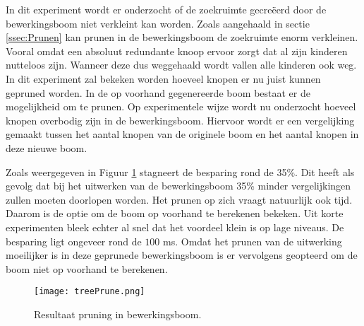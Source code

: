 \documentclass[Main.tex]{subfiles}
\begin{document}
In dit experiment wordt er onderzocht of de zoekruimte gecre\"eerd door de bewerkingsboom niet verkleint kan worden. Zoals aangehaald in sectie \ref{ssec:Prunen} kan prunen in de bewerkingsboom de zoekruimte enorm verkleinen. Vooral omdat een absoluut redundante knoop ervoor zorgt dat al zijn kinderen nutteloos zijn. Wanneer deze dus weggehaald wordt vallen alle kinderen ook weg. In dit experiment zal bekeken worden hoeveel knopen er nu juist kunnen gepruned worden.
In de op voorhand gegenereerde boom bestaat er de mogelijkheid om te prunen. Op experimentele wijze wordt nu onderzocht hoeveel knopen overbodig zijn in de bewerkingsboom. Hiervoor wordt er een vergelijking gemaakt tussen het aantal knopen van de originele boom en het aantal knopen in deze nieuwe boom.
\par Zoals weergegeven in Figuur \ref{fig:pruningInBewerkingsboom} stagneert de besparing rond de 35\%. Dit heeft als gevolg dat bij het uitwerken van de bewerkingsboom 35\% minder vergelijkingen zullen moeten doorlopen worden. Het prunen op zich vraagt natuurlijk ook tijd. Daarom is de optie om de boom op voorhand te berekenen bekeken. Uit korte experimenten bleek echter al snel dat het voordeel klein is op lage niveaus. De besparing ligt ongeveer rond de $100$ ms. Omdat het prunen van de uitwerking moeilijker is in deze geprunede bewerkingsboom is er vervolgens geopteerd om de boom niet op voorhand te berekenen.
\begin{figure}
\centering
\texttt{[image: treePrune.png]} 
\caption{Resultaat pruning in bewerkingsboom.} \label{fig:pruningInBewerkingsboom}
\end{figure}
\end{document}
